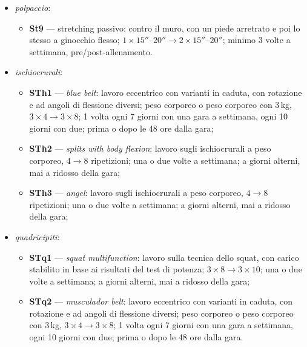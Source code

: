 \begin{itemize}
\begin{itemize}
        peso del corpo; su un ginocchio, separando la gamba opposta;
        $1 \times 15''$--$20'' \rightarrow 2 \times 15''$--$20''$; minimo 3 volte a settimana,
        pre/post-allenamento;
      \item \textbf{St8} --- stretching della catena posteriore (SGA): come St4;
        $1 \times 3'$--$4'$; 1 volta ogni 7 giorni con una gara a settimana, ogni 10 giorni con due;
        sempre, a metà ciclo o dopo la gara;
    \end{itemize}
  \item \textit{polpaccio}:
    \begin{itemize}
      \item \textbf{St9} --- stretching passivo: contro il muro, con un piede arretrato e poi lo
        stesso a ginocchio flesso; $1 \times 15''$--$20'' \rightarrow 2 \times 15''$--$20''$; minimo
        3 volte a settimana, pre/post-allenamento.
    \end{itemize}
\end{itemize}

\begin{itemize}
  \item \textit{ischiocrurali}:
    \begin{itemize}
      \item \textbf{STh1} --- \textit{blue belt}: lavoro eccentrico con varianti in caduta, con
        rotazione e ad angoli di flessione diversi; peso corporeo o peso corporeo con 3\,kg,
        $3 \times 4 \rightarrow 3 \times 8$; 1 volta ogni 7 giorni con una gara a settimana, ogni
        10 giorni con due; prima o dopo le 48 ore dalla gara;
      \item \textbf{STh2} --- \textit{splits with body flexion}: lavoro sugli ischiocrurali a peso
        corporeo, $4 \rightarrow 8$ ripetizioni; una o due volte a settimana; a giorni alterni, mai
        a ridosso della gara;
      \item \textbf{STh3} --- \textit{angel}: lavoro sugli ischiocrurali a peso corporeo,
        $4 \rightarrow 8$ ripetizioni; una o due volte a settimana; a giorni alterni, mai a ridosso
        della gara;
    \end{itemize}
  \item \textit{quadricipiti}:
    \begin{itemize}
      \item \textbf{STq1} --- \textit{squat multifunction}: lavoro sulla tecnica dello squat, con
        carico stabilito in base ai risultati del test di potenza;
        $3 \times 8 \rightarrow 3 \times 10$; una o due volte a settimana; a giorni alterni, mai a
        ridosso della gara;
      \item \textbf{STq2} --- \textit{musculador belt}: lavoro eccentrico con varianti in caduta,
        con rotazione e ad angoli di flessione diversi; peso corporeo o peso corporeo con 3\,kg,
        $3 \times 4 \rightarrow 3 \times 8$; 1 volta ogni 7 giorni con una gara a settimana, ogni
        10 giorni con due; prima o dopo le 48 ore dalla gara.
    \end{itemize}
\end{itemize}

